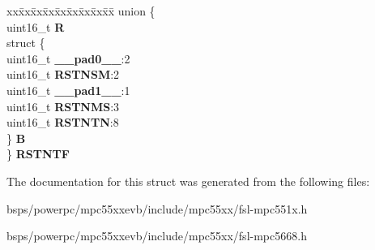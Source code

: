 \begin{DoxyCompactItemize}
\begin{tabbing}
\end{tabbing}\item 
\mbox{\label{structSEMA4__tag_adb942c457bbd21430462bfacc96e930f}} 
\begin{tabbing}
xx\=xx\=xx\=xx\=xx\=xx\=xx\=xx\=xx\=\kill
union \{\\
\>uint16\_t {\bfseries R}\\
\>struct \{\\
\>\>uint16\_t {\bfseries \_\_pad0\_\_}:2\\
\>\>uint16\_t {\bfseries RSTNSM}:2\\
\>\>uint16\_t {\bfseries \_\_pad1\_\_}:1\\
\>\>uint16\_t {\bfseries RSTNMS}:3\\
\>\>uint16\_t {\bfseries RSTNTN}:8\\
\>\} {\bfseries B}\\
\} {\bfseries RSTNTF}\\

\end{tabbing}\end{DoxyCompactItemize}


The documentation for this struct was generated from the following files\+:\begin{DoxyCompactItemize}
\item 
bsps/powerpc/mpc55xxevb/include/mpc55xx/fsl-\/mpc551x.\+h\item 
bsps/powerpc/mpc55xxevb/include/mpc55xx/fsl-\/mpc5668.\+h\end{DoxyCompactItemize}
